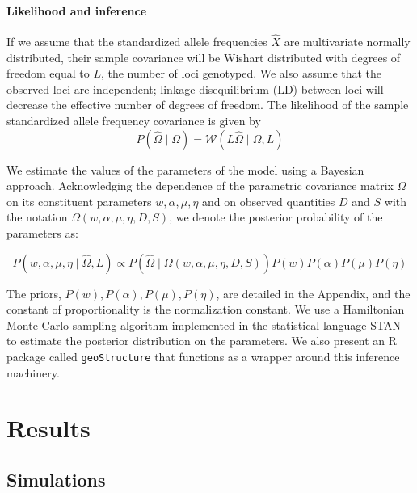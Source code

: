 \documentclass[12pt]{article}
\begin{document}
\paragraph{Likelihood and inference}
If we assume that the standardized allele frequencies $\widehat{X}$ are multivariate normally distributed, 
their sample covariance will be Wishart distributed with degrees of freedom equal to $L$, the number of loci genotyped.
We also assume that the observed loci are independent;
linkage disequilibrium (LD) between loci will decrease the effective number of degrees of freedom.
The likelihood of the sample standardized allele frequency covariance is given by
\begin{equation}
P(\widehat{\Omega} \; | \; \Omega) = \mathcal{W} \left( L\widehat{\Omega} \; | \; \Omega,L\right)
\end{equation}

We estimate the values of the parameters of the model using a Bayesian approach.
Acknowledging the dependence of the parametric covariance matrix $\Omega$ on its constituent parameters
$w,\alpha,\mu,\eta$ and on observed quantities $D$ and $S$ with the notation $\Omega(w,\alpha,\mu,\eta,D,S)$,
we denote the posterior probability of the parameters as:

\begin{equation}
P\left( w,\alpha,\mu,\eta \;	| \; \widehat{\Omega}, L \right) \propto
P\left(\widehat{\Omega} \; | \; \Omega(w,\alpha,\mu,\eta,D,S) \right)
P(w)P(\alpha)P(\mu)P(\eta)
\end{equation}

The priors, $P(w),P(\alpha),P(\mu),P(\eta)$, are detailed in the Appendix,
and the constant of proportionality is the normalization constant.
We use a Hamiltonian Monte Carlo sampling algorithm implemented in the statistical language STAN
\citep{stan, NUTS, stan_lib, rstan} to estimate the posterior distribution on the parameters.
We also present an R package \citep{R} called \texttt{geoStructure} that functions as a wrapper 
around this inference machinery.



\section*{Results}

\subsection*{Simulations}
\end{document}
